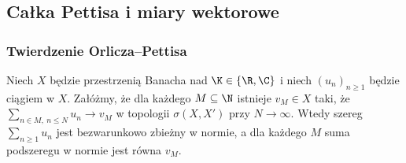 \subsection{Całka Pettisa i miary wektorowe}

\subsubsection{Twierdzenie Orlicza--Pettisa}

\begin{twierdzenie}
\label{thm:orlicz-pettis15b}
Niech $X$ będzie przestrzenią Banacha nad $\K\in\{\R,\C\}$
i niech $(u_n)_{n\ge1}$ będzie ciągiem w $X$.
Załóżmy, że dla każdego $M\subseteq\N$ istnieje $v_M\in X$
taki, że $\sum_{n\in M,\ n\le N}u_n\to v_M$ w topologii
$\sigma(X,X')$ przy $N\to\infty$. Wtedy szereg
$\sum_{n\ge1}u_n$ jest bezwarunkowo zbieżny w normie,
a dla każdego $M$ suma podszeregu w normie jest równa $v_M$.
\end{twierdzenie}
